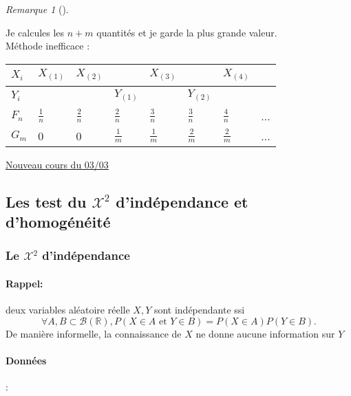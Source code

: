 \documentclass{article}
\theoremstyle{plain}%
\theoremstyle{definition}
\theoremstyle{remark}
\newtheorem*{rem}{Remarque}
\begin{document}
\begin{rem}[]
\begin{enumerate}
            Je calcules les $ n+m $ quantités et je garde la plus grande valeur. \\
            Méthode inefficace : 
            \begin{table}[!h]
                \centering
                \begin{tabular}{|l|l|l|l|l|l|l|l|}
                \hline
                    $ X_i $  & $ X_{(1)} $ & $ X_{(2)} $ & ~ & $ X_{(3)} $ & ~ & $ X_{(4)} $ & ~ \\ \hline
                    $ Y_i $  & ~ & ~ & $ Y_{(1)} $ & ~ & $ Y_{(2)} $ & ~ & ~ \\ \hline
                    $ F_n $  & $ \frac{1}{n} $  & $ \frac{2}{n} $  & $ \frac{2}{n} $  & $ \frac{3}{n} $  & $ \frac{3}{n} $  & $ \frac{4}{n} $  & ... \\ \hline
                    $ G_m $  & 0 & 0 & $ \frac{1}{m} $  & $ \frac{1}{m} $  & $ \frac{2}{m} $  & $ \frac{2}{m} $  & ... \\ \hline
                \end{tabular}
            \end{table}

    \end{enumerate}
\end{rem}

\underline{Nouveau cours du 03/03} \\

\subsection{Les test du $ \mathcal{X}^2 $ d'indépendance et d'homogénéité}
\subsubsection{Le $ \mathcal{X}^2 $ d'indépendance}

\paragraph*{Rappel:} deux variables aléatoire réelle $ X, Y $ sont indépendante ssi 
\[
    \forall A,B \subset \mathcal{B}(\mathbb{R}), P(X \in A \text{ et } Y \in B) = P(X \in A)P(Y \in B)
.\]
De manière informelle, la connaissance de $ X $ ne donne aucune information sur $ Y $ 

\paragraph*{Données}: 
\end{document}

